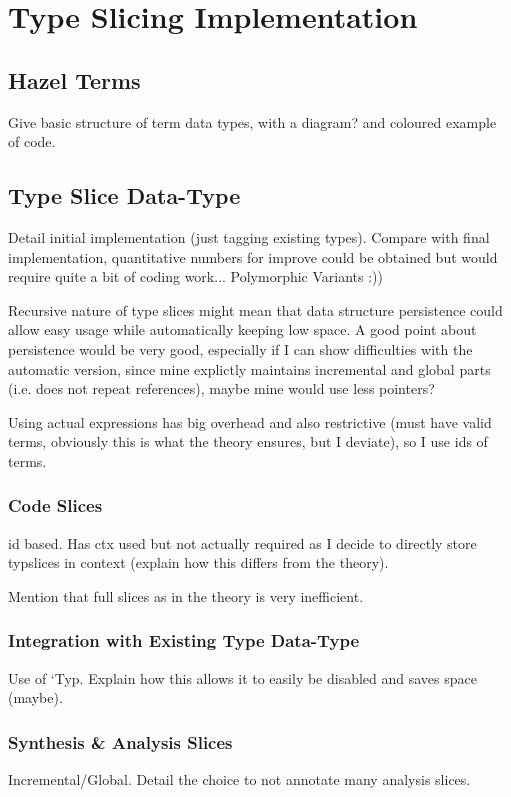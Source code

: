 \section{Type Slicing Implementation}\label{sec:TypeSlicingImplementation}

\subsection{Hazel Terms}
\label{sec:HazelTerms}
Give basic structure of term data types, with a diagram? and coloured example of code.
\subsection{Type Slice Data-Type}\label{sec:TypeSliceDataType}
Detail initial implementation (just tagging existing types). Compare with final implementation, quantitative numbers for improve could be obtained but would require quite a bit of coding work... Polymorphic Variants :))

Recursive nature of type slices might mean that data structure persistence could allow easy usage while automatically keeping low space. A good point about persistence would be very good, especially if I can show difficulties with the automatic version, since mine explictly maintains incremental and global parts (i.e. does not repeat references), maybe mine would use less pointers?

 Using actual expressions has big overhead and also restrictive (must have valid terms, obviously this is what the theory ensures, but I deviate), so I use ids of terms.
\subsubsection{Code Slices}\label{sec:CodeSlices}
id based. Has ctx used but not actually required as I decide to directly store typslices in context (explain how this differs from the theory).

Mention that full slices as in the theory is very inefficient.
\subsubsection{Integration with Existing Type Data-Type}
Use of `Typ. Explain how this allows it to easily be disabled and saves space (maybe).
\subsubsection{Synthesis \& Analysis Slices}
Incremental/Global. Detail the choice to not annotate many analysis slices.
